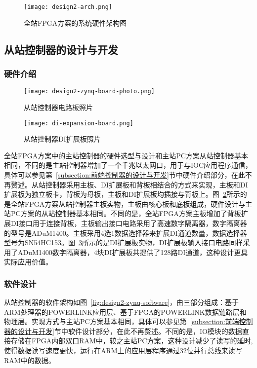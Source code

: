 \begin{figure}[htbp]
  \centering
  \texttt{[image: design2-arch.png]}
  \caption{全站FPGA方案的系统硬件架构图}
  \label{fig:design2-arch}
\end{figure}

\subsection{从站控制器的设计与开发}

\subsubsection{硬件介绍}

\begin{figure}[htbp]
  \centering
  \texttt{[image: design2-zynq-board-photo.png]}
  \caption{从站控制器电路板照片}
  \label{fig:design2-zynq-board-photo}
\end{figure}

\begin{figure}[htbp]
  \centering
  \texttt{[image: di-expansion-board.png]}
  \caption{从站控制器DI扩展板照片}
  \label{fig:di-expansion-board}
\end{figure}

全站FPGA方案中的主站控制器的硬件选型与设计和主站PC方案从站控制器基本相同，不同的是主站控制器增加了一个千兆以太网口，用于与IOC应用程序通信，具体可以参见第~\ref{subsection:前端控制器的设计与开发}节中硬件介绍部分，在此不再赘述。从站控制器采用主板、DI扩展板和背板相结合的方式来实现，主板和DI扩展板为独立板卡，背板为母板，主板和DI扩展板均插接与背板上。图~\ref{fig:design2-zynq-board-photo}所示的是全站FPGA方案从站控制器主板实物，主板由核心板和底板组成，硬件设计与主站PC方案的从站控制器基本相同。不同的是，全站FPGA方案主板增加了背板扩展DI接口用于连接背板，主板输出接口电路采用了高速数字隔离器，数字隔离器的型号是ADuM1400。主板采用4选1数据选择器来扩展DI通道数量，数据选择器型号为SN54HC153。图~\ref{fig:di-expansion-board}所示的是DI扩展板实物，DI扩展板输入接口电路同样采用了ADuM1400数字隔离器，4块DI扩展板共提供了128路DI通道，这种设计更具实际应用价值。


\subsubsection{软件设计}

从站控制器的软件架构如图~\ref{fig:design2-zynq-software}，由三部分组成：基于ARM处理器的POWERLINK应用层、基于FPGA的POWERLINK数据链路层和物理层。实现方式与主站PC方案基本相同，具体可以参见第~\ref{subsection:前端控制器的设计与开发}节中软件设计部分，在此不再赘述。不同的是，IO模块的数据直接存储在FPGA内部双口RAM中，较之主站PC方案，这种设计减少了读写的延时,使得数据读写速度更快，运行在ARM上的应用层程序通过32位并行总线来读写RAM中的数据。

